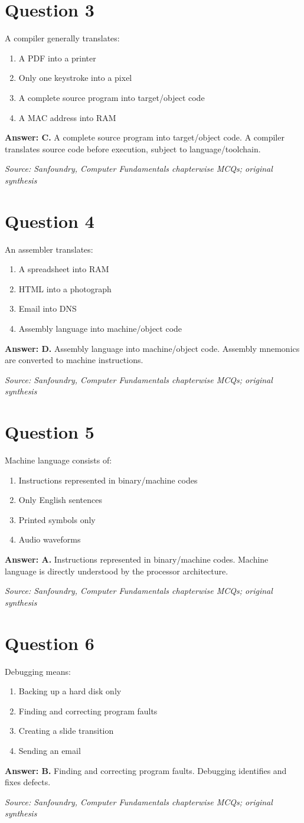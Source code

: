 \documentclass[11pt,a4paper]{book}
\newcommand{\source}[1]{\par\smallskip\textit{Source: #1}}
\newcommand{\answer}[2]{\par\textbf{Answer: #1.} #2}
\begin{document}
\section*{Question 3}
A compiler generally translates:
\begin{enumerate}[label=\Alph*.]
\item A PDF into a printer
\item Only one keystroke into a pixel
\item A complete source program into target/object code
\item A MAC address into RAM
\end{enumerate}
\answer{C}{A complete source program into target/object code. A compiler translates source code before execution, subject to language/toolchain.}
\source{Sanfoundry, Computer Fundamentals chapterwise MCQs; original synthesis}
\section*{Question 4}
An assembler translates:
\begin{enumerate}[label=\Alph*.]
\item A spreadsheet into RAM
\item HTML into a photograph
\item Email into DNS
\item Assembly language into machine/object code
\end{enumerate}
\answer{D}{Assembly language into machine/object code. Assembly mnemonics are converted to machine instructions.}
\source{Sanfoundry, Computer Fundamentals chapterwise MCQs; original synthesis}
\section*{Question 5}
Machine language consists of:
\begin{enumerate}[label=\Alph*.]
\item Instructions represented in binary/machine codes
\item Only English sentences
\item Printed symbols only
\item Audio waveforms
\end{enumerate}
\answer{A}{Instructions represented in binary/machine codes. Machine language is directly understood by the processor architecture.}
\source{Sanfoundry, Computer Fundamentals chapterwise MCQs; original synthesis}
\section*{Question 6}
Debugging means:
\begin{enumerate}[label=\Alph*.]
\item Backing up a hard disk only
\item Finding and correcting program faults
\item Creating a slide transition
\item Sending an email
\end{enumerate}
\answer{B}{Finding and correcting program faults. Debugging identifies and fixes defects.}
\source{Sanfoundry, Computer Fundamentals chapterwise MCQs; original synthesis}
\end{document}
